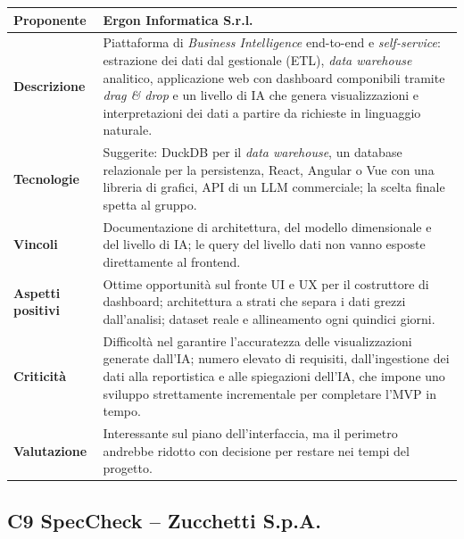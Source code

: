 \begin{longtable}{|>{\raggedright\arraybackslash}p{3.2cm}|>{\raggedright\arraybackslash}p{\dimexpr\textwidth-3.2cm-4\tabcolsep-3\arrayrulewidth\relax}|}
    \hline
    \textbf{Proponente} & Ergon Informatica S.r.l. \\
    \hline
    \textbf{Descrizione} & Piattaforma di \emph{Business Intelligence} end-to-end e \emph{self-service}: estrazione dei dati dal gestionale (ETL), \emph{data warehouse} analitico, applicazione web con dashboard componibili tramite \emph{drag \& drop} e un livello di IA che genera visualizzazioni e interpretazioni dei dati a partire da richieste in linguaggio naturale. \\
    \hline
    \textbf{Tecnologie} & Suggerite: DuckDB per il \emph{data warehouse}, un database relazionale per la persistenza, React, Angular o Vue con una libreria di grafici, API di un LLM commerciale; la scelta finale spetta al gruppo. \\
    \hline
    \textbf{Vincoli} & Documentazione di architettura, del modello dimensionale e del livello di IA; le query del livello dati non vanno esposte direttamente al frontend. \\
    \hline
    \textbf{Aspetti positivi} & Ottime opportunità sul fronte UI e UX per il costruttore di dashboard; architettura a strati che separa i dati grezzi dall'analisi; dataset reale e allineamento ogni quindici giorni. \\
    \hline
    \textbf{Criticità} & Difficoltà nel garantire l'accuratezza delle visualizzazioni generate dall'IA; numero elevato di requisiti, dall'ingestione dei dati alla reportistica e alle spiegazioni dell'IA, che impone uno sviluppo strettamente incrementale per completare l'MVP in tempo. \\
    \hline
    \textbf{Valutazione} & Interessante sul piano dell'interfaccia, ma il perimetro andrebbe ridotto con decisione per restare nei tempi del progetto. \\
    \hline
\end{longtable}

\subsection{C9 SpecCheck -- Zucchetti S.p.A.}


